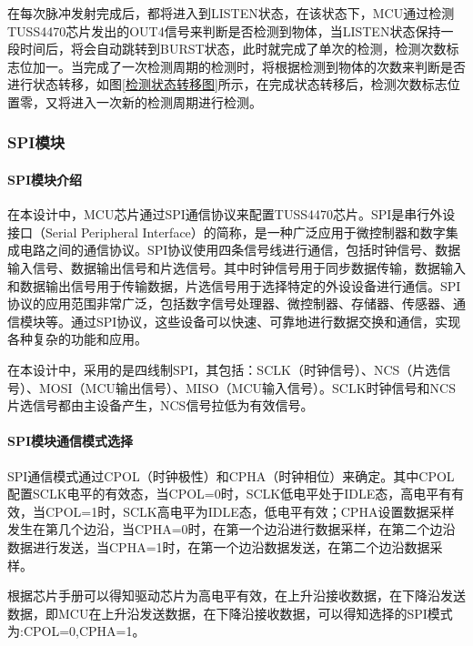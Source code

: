 在每次脉冲发射完成后，都将进入到LISTEN状态，在该状态下，MCU通过检测TUSS4470芯片发出的OUT4信号来判断是否检测到物体，当LISTEN状态保持一段时间后，将会自动跳转到BURST状态，此时就完成了单次的检测，检测次数标志位加一。当完成了一次检测周期的检测时，将根据检测到物体的次数来判断是否进行状态转移，如图\ref{检测状态转移图}所示，在完成状态转移后，检测次数标志位置零，又将进入一次新的检测周期进行检测。

\subsubsection{SPI模块}
\noindent
\paragraph{SPI模块介绍}
在本设计中，MCU芯片通过SPI通信协议来配置TUSS4470芯片。SPI是串行外设接口（Serial Peripheral Interface）的简称，是一种广泛应用于微控制器和数字集成电路之间的通信协议。SPI协议使用四条信号线进行通信，包括时钟信号、数据输入信号、数据输出信号和片选信号。其中时钟信号用于同步数据传输，数据输入和数据输出信号用于传输数据，片选信号用于选择特定的外设设备进行通信。SPI协议的应用范围非常广泛，包括数字信号处理器、微控制器、存储器、传感器、通信模块等。通过SPI协议，这些设备可以快速、可靠地进行数据交换和通信，实现各种复杂的功能和应用。

在本设计中，采用的是四线制SPI，其包括：SCLK（时钟信号）、NCS（片选信号）、MOSI（MCU输出信号）、MISO（MCU输入信号）。SCLK时钟信号和NCS片选信号都由主设备产生，NCS信号拉低为有效信号。
\noindent
\paragraph{SPI模块通信模式选择}
SPI通信模式通过CPOL（时钟极性）和CPHA（时钟相位）来确定。其中CPOL配置SCLK电平的有效态，当CPOL=0时，SCLK低电平处于IDLE态，高电平有有效，当CPOL=1时，SCLK高电平为IDLE态，低电平有效；CPHA设置数据采样发生在第几个边沿，当CPHA=0时，在第一个边沿进行数据采样，在第二个边沿数据进行发送，当CPHA=1时，在第一个边沿数据发送，在第二个边沿数据采样。\par
根据芯片手册可以得知驱动芯片为高电平有效，在上升沿接收数据，在下降沿发送数据，即MCU在上升沿发送数据，在下降沿接收数据，可以得知选择的SPI模式为:CPOL=0,CPHA=1。
\noindent
